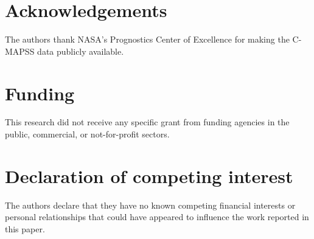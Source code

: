 \documentclass[11pt]{article}
\begin{document}
\section*{Acknowledgements}
The authors thank NASA's Prognostics Center of Excellence for making the C-MAPSS data publicly available.

\section*{Funding}
This research did not receive any specific grant from funding agencies in the public, commercial, or not-for-profit sectors.

\section*{Declaration of competing interest}
The authors declare that they have no known competing financial interests or personal relationships that could have appeared to influence the work reported in this paper.
\end{document}
